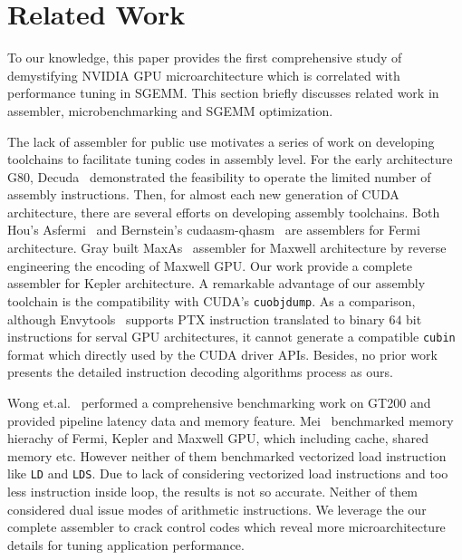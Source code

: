 \section{Related Work}
\label{sec:related}
To our knowledge, this paper provides the first comprehensive study of demystifying NVIDIA GPU microarchitecture which 
is correlated with performance tuning in SGEMM. This section briefly discusses related work in assembler, 
microbenchmarking and SGEMM optimization.

The lack of assembler for public use motivates a series of work on developing toolchains to facilitate tuning codes in 
assembly level. For the early architecture G80, Decuda~\cite{decuda} demonstrated the feasibility to operate the 
limited number of assembly instructions. Then, for almost each new generation of CUDA architecture, there are several 
efforts on developing assembly toolchains. Both Hou's Asfermi~\cite{asfermi} and Bernstein's 
cudaasm-qhasm~\cite{bernstein2012usable} are assemblers for Fermi architecture. Gray built MaxAs~\cite{maxas} assembler 
for Maxwell architecture by reverse engineering the encoding of Maxwell GPU. Our work provide a complete assembler for 
Kepler architecture. A remarkable advantage of our assembly toolchain is the compatibility with CUDA's {\tt cuobjdump}. 
As a comparison, although Envytools~\cite{envytools} supports PTX instruction translated to binary $64$ bit 
instructions for serval GPU architectures, it cannot generate a compatible {\tt cubin} format which directly used by 
the CUDA driver APIs. Besides, no prior work presents the detailed instruction decoding algorithms process as ours.

Wong et.al.~\cite{wong} performed a 
comprehensive benchmarking work on GT200 and provided pipeline latency data and
memory feature. Mei~\cite{mei} benchmarked memory hierachy
of Fermi, Kepler and Maxwell GPU, which including cache, shared memory etc. However neither of them benchmarked 
vectorized load instruction like {\tt LD} and {\tt LDS}. Due to lack of considering vectorized load instructions and 
too less instruction inside loop, the results is not so accurate. Neither of them considered dual issue modes of 
arithmetic instructions. We leverage the our complete assembler to crack control codes which reveal more 
microarchitecture details for tuning application performance.

